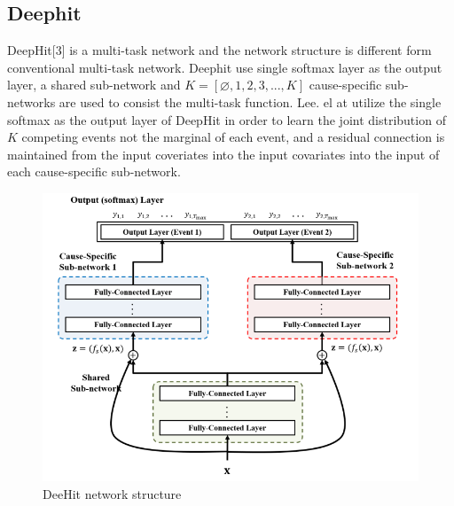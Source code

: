 \documentclass[conference]{IEEEconf}
\begin{document}
\subsection{Deephit}
DeepHit[3] is a multi-task network and the network structure is different form conventional multi-task network. Deephit use single softmax layer as the output layer, a shared sub-network and  $K=[\varnothing,1,2,3,...,K]$ cause-specific sub-networks are used to consist the multi-task function. Lee. el at utilize the single softmax as the output layer of DeepHit in order to learn the joint distribution of $K$ competing events not the marginal of each event, and a residual connection is maintained from the input coveriates into the input covariates into the input of each cause-specific sub-network.
\begin{figure}[htbp]
	\includegraphics[scale=0.5]{network.jpg}
	\caption{DeeHit network structure}
\end{figure}
\end{document}
